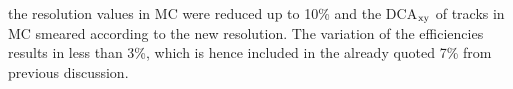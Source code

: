 the resolution values in MC were reduced up to 10\% and the
DCA$_{\rm xy}$ of tracks in MC smeared according to the new resolution.
The variation of the efficiencies results in less than 3\%, which is hence
included in the already quoted 7\% from previous discussion. 


